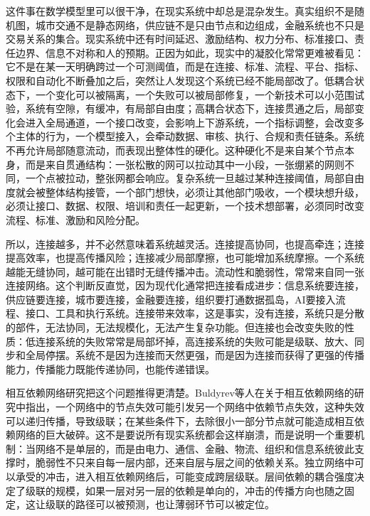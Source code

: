 这件事在数学模型里可以很干净，在现实系统中却总是混杂发生。真实组织不是随机图，城市交通不是静态网络，供应链不是只由节点和边组成，金融系统也不只是交易关系的集合。现实系统中还有时间延迟、激励结构、权力分布、标准接口、责任边界、信息不对称和人的预期。正因为如此，现实中的凝胶化常常更难被看见：它不是在某一天明确跨过一个可测阈值，而是在连接、标准、流程、平台、指标、权限和自动化不断叠加之后，突然让人发现这个系统已经不能局部改了。低耦合状态下，一个变化可以被隔离，一个失败可以被局部修复，一个新技术可以小范围试验，系统有空隙，有缓冲，有局部自由度；高耦合状态下，连接贯通之后，局部变化会进入全局通道，一个接口改变，会影响上下游系统，一个指标调整，会改变多个主体的行为，一个模型接入，会牵动数据、审核、执行、合规和责任链条。系统不再允许局部随意流动，而表现出整体性的硬化。这种硬化不是来自某个节点本身，而是来自贯通结构：一张松散的网可以拉动其中一小段，一张绷紧的网则不同，一个点被拉动，整张网都会响应。复杂系统一旦越过某种连接阈值，局部自由度就会被整体结构接管，一个部门想快，必须让其他部门吸收，一个模块想升级，必须让接口、数据、权限、培训和责任一起更新，一个技术想部署，必须同时改变流程、标准、激励和风险分配。

所以，连接越多，并不必然意味着系统越灵活。连接提高协同，也提高牵连；连接提高效率，也提高传播风险；连接减少局部摩擦，也可能增加系统摩擦。一个系统越能无缝协同，越可能在出错时无缝传播冲击。流动性和脆弱性，常常来自同一张连接网络。这个判断反直觉，因为现代化通常把连接看成进步：信息系统要连接，供应链要连接，城市要连接，金融要连接，组织要打通数据孤岛，AI要接入流程、接口、工具和执行系统。连接带来效率，这是事实，没有连接，系统只是分散的部件，无法协同，无法规模化，无法产生复杂功能。但连接也会改变失败的性质：低连接系统的失败常常是局部坏掉，高连接系统的失败可能是级联、放大、同步和全局停摆。系统不是因为连接而天然更强，而是因为连接而获得了更强的传播能力，传播能力既能传递协同，也能传递错误。

相互依赖网络研究把这个问题推得更清楚。Buldyrev等人在关于相互依赖网络的研究中指出，一个网络中的节点失效可能引发另一个网络中依赖节点失效，这种失效可以递归传播，导致级联；在某些条件下，去除很小一部分节点就可能造成相互依赖网络的巨大破碎\cite{buldyrev2010}。这不是要说所有现实系统都会这样崩溃，而是说明一个重要机制：当网络不是单层的，而是由电力、通信、金融、物流、组织和信息系统彼此支撑时，脆弱性不只来自每一层内部，还来自层与层之间的依赖关系。独立网络中可以承受的冲击，进入相互依赖网络后，可能变成跨层级联。层间依赖的耦合强度决定了级联的规模，如果一层对另一层的依赖是单向的，冲击的传播方向也随之固定，这让级联的路径可以被预测，也让薄弱环节可以被定位。


